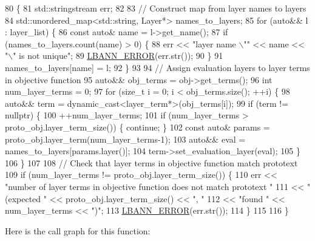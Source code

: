 \begin{DoxyCode}
80                                                                                        \{
81   std::stringstream err;
82 
83   \textcolor{comment}{// Construct map from layer names to layers}
84   std::unordered\_map<std::string, Layer*> names\_to\_layers;
85   \textcolor{keywordflow}{for} (\textcolor{keyword}{auto}&& l : layer\_list) \{
86     \textcolor{keyword}{const} \textcolor{keyword}{auto}& name = l->get\_name();
87     \textcolor{keywordflow}{if} (names\_to\_layers.count(name) > 0) \{
88       err << \textcolor{stringliteral}{"layer name \(\backslash\)""} << name << \textcolor{stringliteral}{"\(\backslash\)" is not unique"};
89       \hyperlink{base_8hpp_a80b1d707117e968a6951b7222e4b2b87}{LBANN\_ERROR}(err.str());
90     \}
91     names\_to\_layers[name] = l;
92   \}
93 
94   \textcolor{comment}{// Assign evaluation layers to layer terms in objective function}
95   \textcolor{keyword}{auto}&& obj\_terms = obj->get\_terms();
96   \textcolor{keywordtype}{int} num\_layer\_terms = 0;
97   \textcolor{keywordflow}{for} (\textcolor{keywordtype}{size\_t} i = 0; i < obj\_terms.size(); ++i) \{
98     \textcolor{keyword}{auto}&& term = \textcolor{keyword}{dynamic\_cast<}layer\_term*\textcolor{keyword}{>}(obj\_terms[i]);
99     \textcolor{keywordflow}{if} (term != \textcolor{keyword}{nullptr}) \{
100       ++num\_layer\_terms;
101       \textcolor{keywordflow}{if} (num\_layer\_terms > proto\_obj.layer\_term\_size()) \{ \textcolor{keywordflow}{continue}; \}
102       \textcolor{keyword}{const} \textcolor{keyword}{auto}& params = proto\_obj.layer\_term(num\_layer\_terms-1);
103       \textcolor{keyword}{auto}&& eval = names\_to\_layers[params.layer()];
104       term->set\_evaluation\_layer(eval);
105     \}
106   \}
107 
108   \textcolor{comment}{// Check that layer terms in objective function match prototext}
109   \textcolor{keywordflow}{if} (num\_layer\_terms != proto\_obj.layer\_term\_size()) \{
110     err << \textcolor{stringliteral}{"number of layer terms in objective function does not match prototext "}
111         << \textcolor{stringliteral}{"(expected "} << proto\_obj.layer\_term\_size() << \textcolor{stringliteral}{", "}
112         << \textcolor{stringliteral}{"found "} << num\_layer\_terms << \textcolor{stringliteral}{")"};
113     \hyperlink{base_8hpp_a80b1d707117e968a6951b7222e4b2b87}{LBANN\_ERROR}(err.str());
114   \}
115   
116 \}
\end{DoxyCode}
Here is the call graph for this function\+:\nopagebreak
